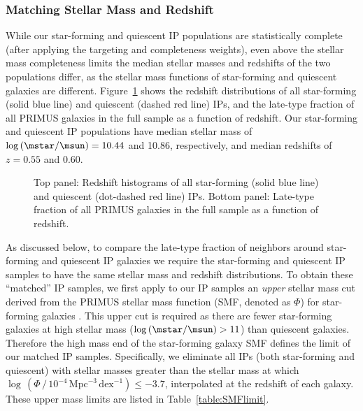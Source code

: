 \subsubsection{Matching Stellar Mass and Redshift}\label{sec:IPsample_matching}

While our star-forming and quiescent IP populations are statistically complete (after applying the targeting and completeness weights), even above the stellar mass completeness limits the median stellar masses and redshifts of the two populations differ, as the stellar mass functions of star-forming and quiescent galaxies are different.
Figure~\ref{fig:IPhist_latefrac_vs_z} shows the redshift distributions of all star-forming (solid blue line) and quiescent (dashed red line) IPs, and the late-type fraction of all PRIMUS galaxies in the full sample as a function of redshift.
Our star-forming and quiescent IP populations have median stellar mass of $\log\,(\mstar/\msun)=10.44$ and 10.86, respectively, and median redshifts of $z=0.55$ and 0.60.

\begin{figure}
  \epstrim{0.1in 0.1in 0.5in 0.8in}
  \caption{Top panel: Redshift histograms of all star-forming (solid blue line) and quiescent (dot-dashed red line) IPs.
Bottom panel: Late-type fraction of all PRIMUS galaxies in the full sample as a function of redshift. 
}
  \label{fig:IPhist_latefrac_vs_z}
\end{figure}

As discussed below, to compare the late-type fraction of neighbors around star-forming and quiescent IP galaxies we require the star-forming and quiescent IP samples to have the same stellar mass and redshift distributions.
To obtain these ``matched'' IP samples, we first apply to our IP samples an {\it upper} stellar mass cut derived from the PRIMUS stellar mass function (SMF, denoted as $\Phi$) for star-forming galaxies \citep{Moustakas13}.
This upper cut is required as there are fewer star-forming galaxies at high stellar mass ($\log\,(\mstar/\msun)>11$) than quiescent galaxies.
Therefore the high mass end of the star-forming galaxy SMF defines the limit of our matched IP samples.  
Specifically, we eliminate all IPs (both star-forming and quiescent) with stellar masses greater than the stellar mass at which 
${\log\,(\Phi \,/\, 10^{-4}\,\text{Mpc}^{-3}\,\text{dex}^{-1}) \le -3.7}$, interpolated at the redshift of each galaxy.
These upper mass limits are listed in Table~\ref{table:SMFlimit}.


